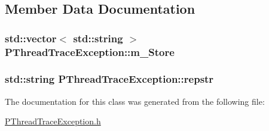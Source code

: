 \subsection{Member Data Documentation}
\hypertarget{classPThreadTraceException_a15692bd7f36282499cf4aac7cfab13b9}{
\subsubsection[{m\-\_\-\-Store}]{\setlength{\rightskip}{0pt plus 5cm}std\-::vector$<$ std\-::string $>$ P\-Thread\-Trace\-Exception\-::m\-\_\-\-Store\hspace{0.3cm}{\ttfamily [protected]}}}\label{classPThreadTraceException_a15692bd7f36282499cf4aac7cfab13b9}
\hypertarget{classPThreadTraceException_a5bd236044d0ef73ac6db56add023427a}{
\subsubsection[{repstr}]{\setlength{\rightskip}{0pt plus 5cm}std\-::string P\-Thread\-Trace\-Exception\-::repstr\hspace{0.3cm}{\ttfamily [protected]}}}\label{classPThreadTraceException_a5bd236044d0ef73ac6db56add023427a}


The documentation for this class was generated from the following file\-:\begin{DoxyCompactItemize}
\item 
\hyperlink{PThreadTraceException_8h}{P\-Thread\-Trace\-Exception.\-h}\end{DoxyCompactItemize}
